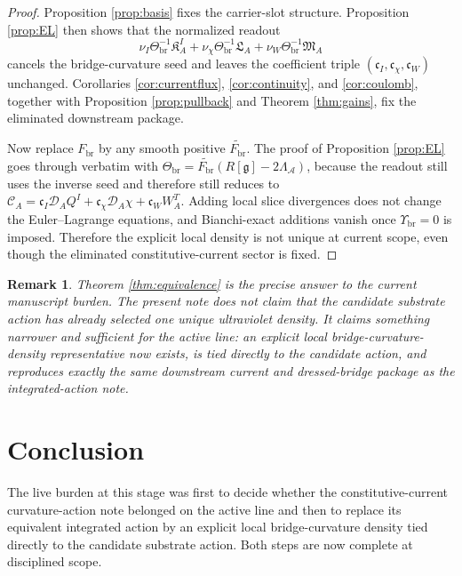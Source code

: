 \documentclass[11pt]{article}
\newcommand{\Sub}{\mathcal{A}}
\newcommand{\BridgeMetric}{\mathfrak g}
\newcommand{\SpatialD}{\mathcal D}
\newcommand{\ConstCurrent}{\mathcal C}
\newcommand{\CurvSeed}{\Theta_{\mathrm{br}}}
\newcommand{\CurvSeedMult}{\Upsilon_{\mathrm{br}}}
\newcommand{\CurvProfile}{F_{\mathrm{br}}}
\newcommand{\CurvOneI}{\mathfrak K}
\newcommand{\CurvOneChi}{\mathfrak L}
\newcommand{\CurvOneW}{\mathfrak M}
\newtheorem{remark}{Remark}
\begin{document}
\begin{proof}
Proposition \ref{prop:basis} fixes the carrier-slot structure. Proposition \ref{prop:EL} then shows that the normalized readout
\[
\nu_I\CurvSeed^{-1}\CurvOneI_A^I
+\nu_\chi\CurvSeed^{-1}\CurvOneChi_A
+\nu_W\CurvSeed^{-1}\CurvOneW_A
\]
cancels the bridge-curvature seed and leaves the coefficient triple \((\mathfrak c_I,\mathfrak c_\chi,\mathfrak c_W)\) unchanged. Corollaries \ref{cor:currentflux}, \ref{cor:continuity}, and \ref{cor:coulomb}, together with Proposition \ref{prop:pullback} and Theorem \ref{thm:gains}, fix the eliminated downstream package.

Now replace \(\CurvProfile\) by any smooth positive \(\widetilde{\CurvProfile}\). The proof of Proposition \ref{prop:EL} goes through verbatim with \(\CurvSeed=\widetilde{\CurvProfile}(R[\BridgeMetric]-2\Lambda_{\Sub})\), because the readout still uses the inverse seed and therefore still reduces to \(\ConstCurrent_A=\mathfrak c_I\SpatialD_AQ^I+\mathfrak c_\chi\SpatialD_A\chi+\mathfrak c_WW_A^T\). Adding local slice divergences does not change the Euler--Lagrange equations, and Bianchi-exact additions vanish once \(\CurvSeedMult=0\) is imposed. Therefore the explicit local density is not unique at current scope, even though the eliminated constitutive-current sector is fixed.
\end{proof}

\begin{remark}
Theorem \ref{thm:equivalence} is the precise answer to the current manuscript burden. The present note does not claim that the candidate substrate action has already selected one unique ultraviolet density. It claims something narrower and sufficient for the active line: an explicit local bridge-curvature-density representative now exists, is tied directly to the candidate action, and reproduces exactly the same downstream current and dressed-bridge package as the integrated-action note.
\end{remark}

\section{Conclusion}

The live burden at this stage was first to decide whether the constitutive-current curvature-action note belonged on the active line and then to replace its equivalent integrated action by an explicit local bridge-curvature density tied directly to the candidate substrate action. Both steps are now complete at disciplined scope.
\end{document}
